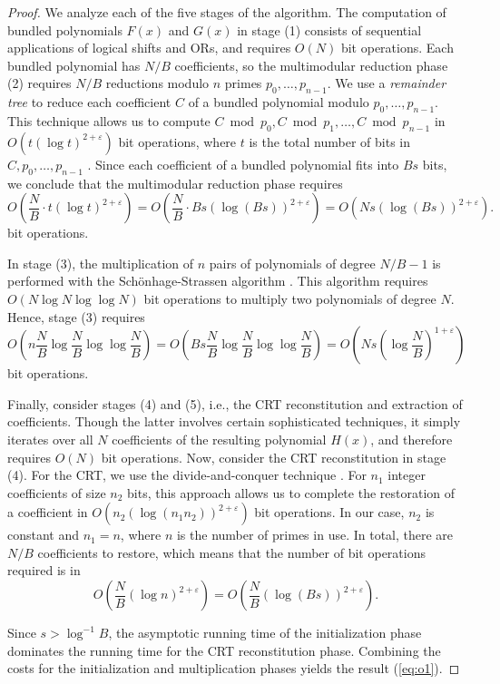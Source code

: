 \documentclass{mcom-l}
\theoremstyle{definition}
\begin{document}
\begin{proof}
We analyze each of the five stages of the algorithm.  The computation
of bundled polynomials $F(x)$ and $G(x)$ in stage (1) consists of
sequential applications of logical shifts and ORs, and requires $O(N)$
bit operations. Each bundled polynomial has $N / B$ coefficients, so
the multimodular reduction phase (2) requires $N/B$ reductions modulo
$n$ primes $p_0, \ldots, p_{n-1}$. We use a \emph{remainder tree} to
reduce each coefficient $C$ of a bundled polynomial modulo $p_0,
\ldots, p_{n-1}$. This technique allows us to compute $C \bmod p_0, C
\bmod p_1, \ldots, C \bmod p_{n-1}$ in $O\left(t\left(\log
t\right)^{2+\varepsilon}\right)$ bit operations, where $t$ is the
total number of bits in $C, p_0, \ldots, p_{n-1}$ \cite[Section
  3]{borodin}. Since each coefficient of a bundled polynomial fits
into $Bs$ bits, we conclude that the multimodular reduction phase requires
$$
O\left(\frac{N}{B}\cdot t\left(\log t\right)^{2+\varepsilon}\right) = O\left(\frac{N}{B} \cdot Bs\left(\log (Bs)\right)^{2+\varepsilon}\right) = O\left(Ns\left(\log(Bs)\right)^{2+\varepsilon}\right).
$$
bit operations.

In stage (3), the multiplication of $n$ pairs of polynomials of degree
$N/B - 1$ is performed with the Sch\"onhage-Strassen algorithm
\cite[Sections 8.2 -- 8.4]{gathen}. This algorithm requires $O(N\log N
\log\log N)$ bit operations to multiply two polynomials of degree $N$.
Hence, stage (3) requires
$$
O\left(n\frac{N}{B}\log\frac{N}{B}\log\log\frac{N}{B}\right) = O\left(Bs\frac{N}{B}\log\frac{N}{B}\log\log\frac{N}{B}\right) = O\left(Ns\left(\log\frac{N}{B}\right)^{1+\varepsilon}\right)
$$
bit operations.

Finally, consider stages (4) and (5), i.e., the CRT reconstitution and
extraction of coefficients. Though the latter involves certain
sophisticated techniques, it simply iterates over all $N$ coefficients
of the resulting polynomial $H(x)$, and therefore requires $O(N)$ bit
operations. Now, consider the CRT reconstitution in stage (4). For the
CRT, we use the divide-and-conquer technique
\cite[Section~4]{hart}. For $n_1$ integer coefficients of size $n_2$
bits, this approach allows us to complete the restoration of a
coefficient in
$O\left(n_2\left(\log(n_1n_2)\right)^{2+\varepsilon}\right)$ bit
operations. In our case, $n_2$ is constant and $n_1 = n$, where $n$ is
the number of primes in use. In total, there are $N/B$ coefficients to
restore, which means that the number of bit operations required is in
$$
O\left(\frac{N}{B}(\log n)^{2+\varepsilon}\right) =
O\left(\frac{N}{B}\left(\log (Bs)\right)^{2+\varepsilon}\right).
$$

Since $s > \log^{-1}B$, the asymptotic running time of the
initialization phase dominates the running time for the CRT
reconstitution phase. Combining the costs for the initialization and
multiplication phases yields the result (\ref{eq:o1}).
\end{proof}
\end{document}
